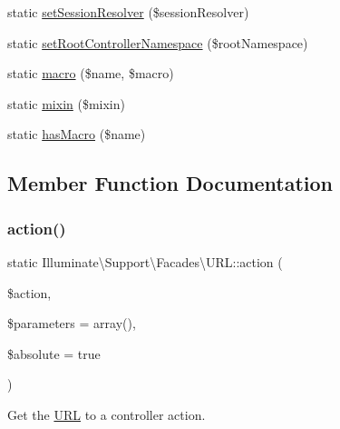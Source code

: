 \begin{DoxyCompactItemize}
static \mbox{\hyperlink{class_illuminate_1_1_support_1_1_facades_1_1_u_r_l_a2ed355860bdc0c3ef7c14f9e25e3ca0c}{set\+Session\+Resolver}} (\$session\+Resolver)
\item 
static \mbox{\hyperlink{class_illuminate_1_1_support_1_1_facades_1_1_u_r_l_a7e797a6b02f0f32f0aec3d7bda773f21}{set\+Root\+Controller\+Namespace}} (\$root\+Namespace)
\item 
static \mbox{\hyperlink{class_illuminate_1_1_support_1_1_facades_1_1_u_r_l_adb4bd9822b104223dc4d2aa8e7dfdb69}{macro}} (\$name, \$macro)
\item 
static \mbox{\hyperlink{class_illuminate_1_1_support_1_1_facades_1_1_u_r_l_a4e5c5c9a4d923538912058383f0c1bcd}{mixin}} (\$mixin)
\item 
static \mbox{\hyperlink{class_illuminate_1_1_support_1_1_facades_1_1_u_r_l_ae711440f4d43b9be282d9a9a24350e43}{has\+Macro}} (\$name)
\end{DoxyCompactItemize}


\subsection{Member Function Documentation}
\mbox{\label{class_illuminate_1_1_support_1_1_facades_1_1_u_r_l_aa9bc48532642767caa0e353dc7b9c11b}} 
\subsubsection{\texorpdfstring{action()}{action()}}
{\footnotesize\ttfamily static Illuminate\textbackslash{}\+Support\textbackslash{}\+Facades\textbackslash{}\+U\+R\+L\+::action (\begin{DoxyParamCaption}\item[{}]{\$action,  }\item[{}]{\$parameters = {\ttfamily array()},  }\item[{}]{\$absolute = {\ttfamily true} }\end{DoxyParamCaption})\hspace{0.3cm}{\ttfamily [static]}}

Get the \mbox{\hyperlink{class_illuminate_1_1_support_1_1_facades_1_1_u_r_l}{U\+RL}} to a controller action.


